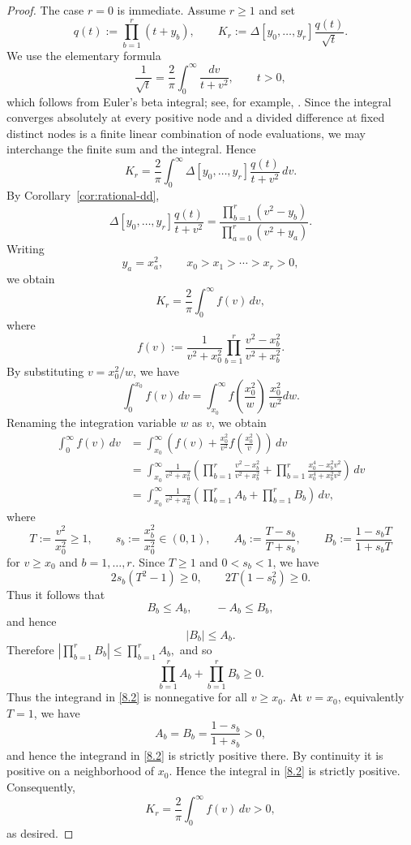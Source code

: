 \documentclass[12pt]{amsart}
\theoremstyle{definition}
\newcommand{\DD}{\Delta}
\begin{document}
\begin{proof}
The case $r=0$ is immediate. Assume $r\ge1$ and set
\[
q(t):=\prod_{b=1}^r(t+y_b),
\qquad
K_r:=
\DD[y_0,\ldots,y_r]
\frac{q(t)}{\sqrt t}.
\]
We use the elementary formula
\[
\frac1{\sqrt t}
=
\frac2\pi
\int_0^\infty
\frac{dv}{t+v^2},
\qquad t>0,
\]
which follows from Euler's beta integral;
see, for example, \cite[Chapter~1]{AndrewsAskeyRoy}.
Since the integral converges absolutely at every positive node and a
divided difference at fixed distinct nodes is a finite linear combination
of node evaluations, we may interchange the finite sum and the integral.
Hence
\[
K_r
=
\frac2\pi
\int_0^\infty
\DD[y_0,\ldots,y_r]
\frac{q(t)}{t+v^2}
\,dv.
\]
By Corollary~\ref{cor:rational-dd},
\[
\DD[y_0,\ldots,y_r]
\frac{q(t)}{t+v^2}
=
\frac{\prod_{b=1}^r(v^2-y_b)}{\prod_{a=0}^r(v^2+y_a)}.
\]
Writing
\[
y_a=x_a^2,
\qquad
x_0>x_1>\cdots>x_r>0,
\]
we obtain
\[
K_r
=
\frac2\pi
\int_0^\infty
f(v)\,dv,
\]
where
\[
f(v)
:=
\frac1{v^2+x_0^2}
\prod_{b=1}^r
\frac{v^2-x_b^2}
     {v^2+x_b^2}.
\]
By substituting $v= x_0^2 / w$,
we have
\[
\int_0^{x_0}
f(v)\,dv
=
\int_{x_0}^{\infty}
f\!\left(\frac{x_0^2}{w}\right)
     \, \frac{x_0^2}{w^2} dw.
\]
Renaming the integration variable \(w\) as \(v\), we obtain
\begin{equation}\label{8.2}
\begin{aligned}
\int_0^\infty f(v)\,dv
&=
\int_{x_0}^\infty
\left(
f(v)
+
\frac{x_0^2}{v^2}
f\!\left(\frac{x_0^2}{v}\right)
\right)\,dv\\
&=
\int_{x_0}^\infty
\frac1{v^2+x_0^2}
\left(
\prod_{b=1}^r
\frac{v^2-x_b^2}
     {v^2+x_b^2}
+
\prod_{b=1}^r
\frac{x_0^4-x_b^2v^2}
     {x_0^4+x_b^2v^2}
\right)\,dv\\
&=
\int_{x_0}^\infty
\frac1{v^2+x_0^2}
\left(
\prod_{b=1}^r A_b
+
\prod_{b=1}^r B_b
\right)\,dv,
\end{aligned}
\end{equation}
where
\[
T:=\frac{v^2}{x_0^2}\ge1,
\qquad
s_b:=\frac{x_b^2}{x_0^2}\in(0,1),
\qquad
A_b:=\frac{T-s_b}{T+s_b},
\qquad
B_b:=\frac{1-s_bT}{1+s_bT}
\]
for $v\ge x_0$ and $b = 1,\dots,r$.
Since \(T\ge1\) and \(0<s_b<1\), we have
\[
2s_b(T^2-1)\ge0, \qquad
2T(1-s_b^2)\ge0.
\]
Thus it follows that
\[
B_b\le A_b,
\qquad
-A_b\le B_b,
\]
and hence
\[
|B_b|\le A_b.
\]
Therefore
\(
\left|
\prod_{b=1}^r B_b
\right|
\le
\prod_{b=1}^r A_b,
\)
and so
\[
\prod_{b=1}^r A_b
+
\prod_{b=1}^r B_b
\ge0.
\]
Thus the integrand in \eqref{8.2} is nonnegative for all $v\ge x_0$.
At $v=x_0$, equivalently $T=1$, we have
\[
A_b=B_b=\frac{1-s_b}{1+s_b}>0,
\]
and hence the integrand in \eqref{8.2} is strictly positive there. By continuity it is positive
on a neighborhood of $x_0$. Hence the integral in \eqref{8.2} is
strictly positive.
Consequently,
\[
K_r
=
\frac2\pi
\int_0^\infty f(v)\,dv
>0,
\]
as desired.
\end{proof}
\end{document}
